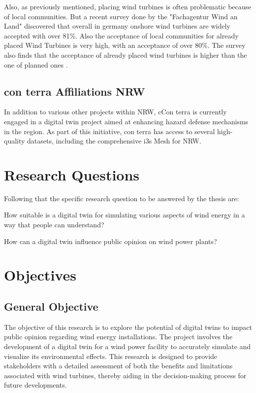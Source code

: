 \documentclass[11pt, titlepage, a4paper]{scrartcl}
\begin{document}
\begin{linenumbers}
    Also, as previously mentioned, placing wind turbines is often problematic because of local communities. But a recent survey done by the "Fachagentur Wind an Land" discovered that overall in germany onshore wind turbines are widely accepted with over 81\%. Also the acceptance of local communities for already placed Wind Turbines is very high, with an acceptance of over 80\%. The survey also finds that the acceptance of already placed wind turbines is higher than the one of planned ones \cite{fachagenturwindenergieanlandUmfrageZurAkzeptanz}.
    \subsection{con terra Affiliations NRW}
    In addition to various other projects within NRW, cCon terra is currently engaged in a digital twin project aimed at enhancing hazard defense mechanisms in the region. As part of this initiative, con terra has access to several high-quality datasets, including the comprehensive i3s Mesh for NRW.


    \section{Research Questions}
    Following that the specific research question to be answered by the thesis are:
    \begin{questions}
        \item \label{rq:first_q} How suitable is a digital twin for simulating various aspects of wind energy in a way that people can understand?
        \item \label{rq:second_q} How can a digital twin influence public opinion on wind power plants?
    \end{questions}

    \section{Objectives}
    \subsection{General Objective}
    The objective of this research is to explore the potential of digital twins to impact public opinion regarding wind energy installations. The project involves the development of a digital twin for a wind power facility to accurately simulate and visualize its environmental effects. This research is designed to provide stakeholders with a detailed assessment of both the benefits and limitations associated with wind turbines, thereby aiding in the decision-making process for future developments.


\end{linenumbers}
\end{document}
